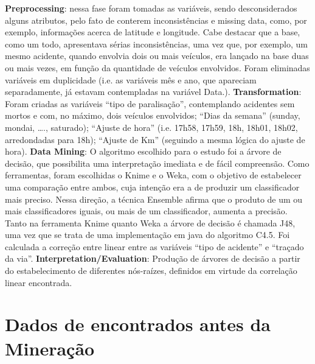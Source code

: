 \documentclass[conference,compsoc]{IEEEtran}
\begin{document}
\textbf{Preprocessing}: nessa fase foram tomadas as variáveis, sendo desconsiderados alguns atributos, pelo fato de conterem inconsistências e 
missing data, como, por exemplo, informações acerca de latitude e longitude. Cabe destacar que a base, como um todo, apresentava sérias 
inconsistências, uma vez que, por exemplo, um mesmo acidente, quando envolvia dois ou mais veículos, era lançado na base duas ou mais 
vezes, em função da quantidade de veículos envolvidos. Foram eliminadas variáveis em duplicidade (i.e. as variáveis mês e ano, que apareciam 
separadamente, já estavam contempladas na variável Data.).
\textbf{Transformation}: Foram criadas as variáveis ``tipo de paralisação'', contemplando acidentes sem mortos e com, no máximo, 
dois veículos envolvidos; ``Dias da semana'' (sunday, mondai, …., saturado); ``Ajuste de hora'' (i.e. 17h58, 17h59, 18h, 18h01, 18h02, 
arredondadas para 18h); ``Ajuste de Km'' (seguindo a mesma lógica do ajuste de hora).
\textbf{Data Mining}: O algoritmo escolhido para o estudo foi a árvore de decisão, que possibilita uma interpretação imediata e de fácil 
compreensão. Como ferramentas, foram escolhidas o Knime e o Weka, com o objetivo de estabelecer uma comparação entre ambos, cuja intenção 
era a de produzir um classificador mais preciso. Nessa direção, a técnica Ensemble afirma que o produto de um ou mais classificadores 
iguais, ou mais de um classificador, aumenta a precisão. Tanto na ferramenta Knime quanto Weka a árvore de decisão é chamada J48, uma vez 
que se trata de uma implementação em java do algoritmo C4.5. Foi calculada a correção entre linear entre as variáveis ``tipo de acidente'' 
e ``traçado da via''.
\textbf{Interpretation/Evaluation}: Produção de árvores de decisão a partir do estabelecimento de diferentes nós-raízes, definidos em 
virtude da correlação linear encontrada.

\section{Dados de encontrados antes da Mineração}
\end{document}
